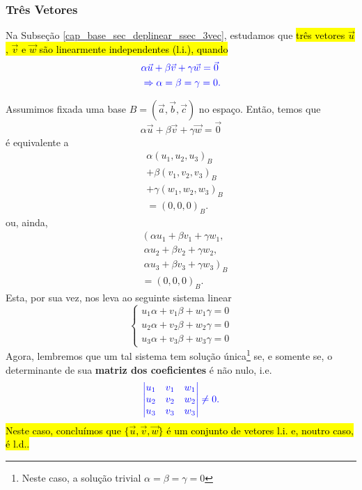 \subsubsection{Três Vetores}

Na Subseção \ref{cap_base_sec_deplinear_ssec_3vec}, estudamos que \hl{três vetores $\vec{u}$, $\vec{v}$ e $\vec{w}$ são linearmente independentes (l.i.), quando}
\begin{equation}\color{blue}\begin{aligned}
    &\alpha\vec{u}+\beta\vec{v}+\gamma\vec{w}=\vec{0} \\
    &\Rightarrow \alpha=\beta=\gamma=0.
  \end{aligned}
\end{equation}

Assumimos fixada uma base $B = (\vec{a}, \vec{b}, \vec{c})$ no espaço. Então, temos que
\begin{equation}
  \alpha\vec{u}+\beta\vec{v}+\gamma\vec{w} = \vec{0}
\end{equation}
é equivalente a
\begin{align}
  &\alpha(u_1,u_2,u_3)_B\nonumber\\
  &+ \beta(v_1,v_2,v_3)_B\nonumber\\
  &+ \gamma(w_1,w_2,w_3)_B\nonumber\\
  &= (0, 0, 0)_B.
\end{align}
ou, ainda,
\begin{align}
  &\left(\alpha u_1 + \beta v_1 + \gamma w_1,\right.\nonumber\\
  &\left.~\alpha u_2 + \beta v_2 + \gamma w_2,\right.\nonumber\\
  &\left.~\alpha u_3 + \beta v_3 + \gamma w_3\right)_B\nonumber\\
  &= (0, 0, 0)_B.
\end{align}
Esta, por sua vez, nos leva ao seguinte sistema linear
\begin{equation}
  \left\{
    \begin{array}{l}
      u_1\alpha + v_1\beta + w_1\gamma = 0\\
      u_2\alpha + v_2\beta + w_2\gamma = 0\\
      u_3\alpha + v_3\beta + w_3\gamma = 0
    \end{array}
  \right.
\end{equation}
Agora, lembremos que um tal sistema tem solução única\footnote{Neste caso, a solução trivial $\alpha = \beta = \gamma = 0$} se, e somente se, o determinante de sua \textbf{matriz dos coeficientes} é não nulo, i.e.
\begin{equation}\color{blue}\begin{vmatrix}
    u_1 & v_1 & w_1\\
    u_2 & v_2 & w_2\\
    u_3 & v_3 & w_3
  \end{vmatrix} \neq 0.
\end{equation}
\hl{Neste caso, concluímos que $\{\vec{u}, \vec{v}, \vec{w}\}$ é um conjunto de vetores l.i. e, noutro caso, é l.d..}

